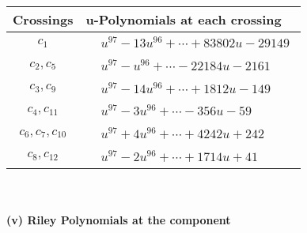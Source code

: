 \documentclass[1p]{elsarticle_modified}
\theoremstyle{definition}
\begin{document}
\begin{tabular}{m{50pt}|m{274pt}}
Crossings & \hspace{64pt}u-Polynomials at each crossing \\
\hline $$\begin{aligned}c_{1}\end{aligned}$$&$\begin{aligned}
&u^{97}-13 u^{96}+\cdots+83802 u-29149
\end{aligned}$\\
\hline $$\begin{aligned}c_{2},c_{5}\end{aligned}$$&$\begin{aligned}
&u^{97}- u^{96}+\cdots-22184 u-2161
\end{aligned}$\\
\hline $$\begin{aligned}c_{3},c_{9}\end{aligned}$$&$\begin{aligned}
&u^{97}-14 u^{96}+\cdots+1812 u-149
\end{aligned}$\\
\hline $$\begin{aligned}c_{4},c_{11}\end{aligned}$$&$\begin{aligned}
&u^{97}-3 u^{96}+\cdots-356 u-59
\end{aligned}$\\
\hline $$\begin{aligned}c_{6},c_{7},c_{10}\end{aligned}$$&$\begin{aligned}
&u^{97}+4 u^{96}+\cdots+4242 u+242
\end{aligned}$\\
\hline $$\begin{aligned}c_{8},c_{12}\end{aligned}$$&$\begin{aligned}
&u^{97}-2 u^{96}+\cdots+1714 u+41
\end{aligned}$\\
\hline
\end{tabular}\\~\\
\newpage\renewcommand{\arraystretch}{1}
\flushleft \textbf{(v) Riley Polynomials at the component}\newline \\
\end{document}

